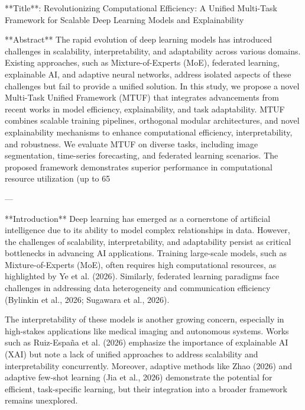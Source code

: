 **Title**: Revolutionizing Computational Efficiency: A Unified Multi-Task Framework for Scalable Deep Learning Models and Explainability  

**Abstract**  
The rapid evolution of deep learning models has introduced challenges in scalability, interpretability, and adaptability across various domains. Existing approaches, such as Mixture-of-Experts (MoE), federated learning, explainable AI, and adaptive neural networks, address isolated aspects of these challenges but fail to provide a unified solution. In this study, we propose a novel Multi-Task Unified Framework (MTUF) that integrates advancements from recent works in model efficiency, explainability, and task adaptability. MTUF combines scalable training pipelines, orthogonal modular architectures, and novel explainability mechanisms to enhance computational efficiency, interpretability, and robustness. We evaluate MTUF on diverse tasks, including image segmentation, time-series forecasting, and federated learning scenarios. The proposed framework demonstrates superior performance in computational resource utilization (up to 65%

---

**Introduction**  
Deep learning has emerged as a cornerstone of artificial intelligence due to its ability to model complex relationships in data. However, the challenges of scalability, interpretability, and adaptability persist as critical bottlenecks in advancing AI applications. Training large-scale models, such as Mixture-of-Experts (MoE), often requires high computational resources, as highlighted by Ye et al. (2026). Similarly, federated learning paradigms face challenges in addressing data heterogeneity and communication efficiency (Bylinkin et al., 2026; Sugawara et al., 2026).

The interpretability of these models is another growing concern, especially in high-stakes applications like medical imaging and autonomous systems. Works such as Ruiz-España et al. (2026) emphasize the importance of explainable AI (XAI) but note a lack of unified approaches to address scalability and interpretability concurrently. Moreover, adaptive methods like Zhao (2026) and adaptive few-shot learning (Jia et al., 2026) demonstrate the potential for efficient, task-specific learning, but their integration into a broader framework remains unexplored.

